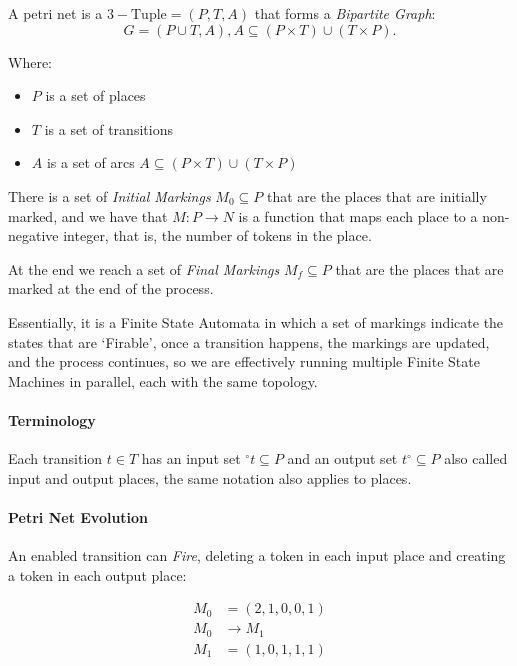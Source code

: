 \documentclass[openright, twoside, twocolumn]{report}
\begin{document}
    \begin{definition}
      \label{def:petri-nets}
      A petri net is a $3-\text{Tuple} = (P, T, A)$
      that forms a \emph{Bipartite Graph}:
    \[
      G = (P \cup T, A), A \subseteq (P \times T) \cup (T \times P)
    .\]

    Where:

    \begin{itemize}
      \item $P$ is a set of places
      \item $T$ is a set of transitions
      \item $A$ is a set of arcs $A \subseteq (P \times T) \cup (T \times P)$
    \end{itemize}

    There is a set of \emph{Initial Markings} $M_0 \subseteq P$ that are the places that are initially marked,
    and we have that $M:P \to N$ is a function that maps each place to a non-negative integer, that is,
    the number of tokens in the place.

    At the end we reach a set of \emph{Final Markings} $M_f \subseteq P$ that are the places that are marked at the end of the process.
    \end{definition}

    Essentially, it is a Finite State Automata in which a set of markings indicate the states that are `Firable', once a transition
    happens, the markings are updated, and the process continues, so we are effectively running multiple Finite State Machines
    in parallel, each with the same topology.

    \paragraph{Terminology}

    Each transition $t \in  T$  has an input set ${}^{\circ}t \subseteq P$ and an output set $t^{\circ} \subseteq  P$ also called input
    and output places, the same notation also applies to places.

    \paragraph{Petri Net Evolution}

    An enabled transition can \emph{Fire}, deleting a token in each input place and creating a token in each output place:

    \begin{align*}
      M_0 &= \left( 2, 1, 0, 0, 1 \right)\\
      M_0 &\to M_1\\
      M_1 &= \left( 1, 0, 1, 1, 1 \right)
    \end{align*}
\end{document}
